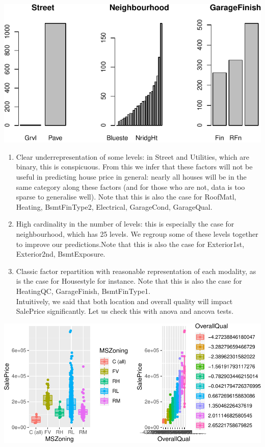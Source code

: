 \documentclass[]{article}
\providecommand{\tightlist}{%
  \setlength{\itemsep}{0pt}\setlength{\parskip}{0pt}}
\begin{document}
\begin{center}\includegraphics{r_file_v5_files/figure-latex/unnamed-chunk-13-1} \end{center}

\begin{enumerate}
\def\labelenumi{\roman{enumi})}
\tightlist
\item
  Clear underrepresentation of some levels: in Street and Utilities,
  which are binary, this is conspicuous. From this we infer that these
  factors will not be useful in predicting house price in general:
  nearly all houses will be in the same category along these factors
  (and for those who are not, data is too sparse to generalise well).
  Note that this is also the case for RoofMatl, Heating, BsmtFinType2,
  Electrical, GarageCond, GarageQual.\\
\item
  High cardinality in the number of levels: this is especially the case
  for neighbourhood, which has 25 levels. We regroup some of these
  levels together to improve our predictions.Note that this is also the
  case for Exterior1st, Exterior2nd, BsmtExposure.
\item
  Classic factor repartition with reasonable representation of each
  modality, as is the case for Housestyle for instance. Note that this
  is also the case for HeatingQC, GarageFinish, BsmtFinType1.\\
  Intuitively, we said that both location and overall quality will
  impact SalePrice significantly. Let us check this with anova and
  ancova tests.
\end{enumerate}

\begin{center}\includegraphics{r_file_v5_files/figure-latex/unnamed-chunk-15-1} \end{center}
\end{document}
